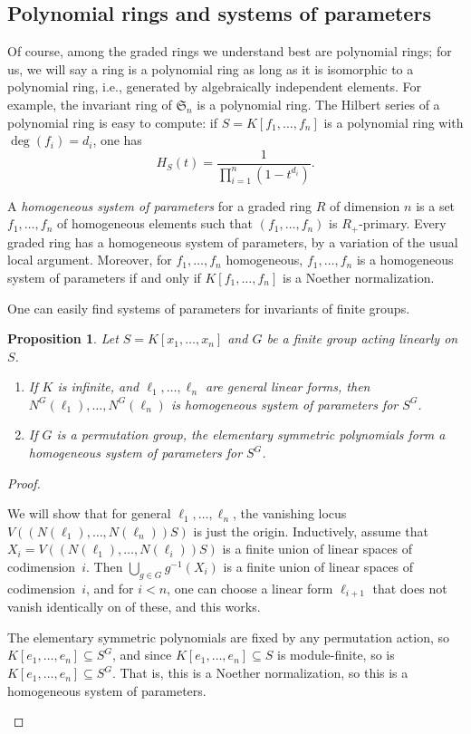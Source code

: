 \documentclass[12pt]{amsart}
\newtheorem{proposition}[theorem]{Proposition}
\theoremstyle{definition}
\numberwithin{equation}{theorem}
\begin{document}
\subsection*{Polynomial rings and systems of parameters} Of course, among the graded rings we understand best are polynomial rings; for us, we will say a ring is a polynomial ring as long as it is isomorphic to a polynomial ring, i.e., generated by algebraically independent elements. For example, the invariant ring of $\mathfrak{S}_n$ is a polynomial ring. The Hilbert series of a polynomial ring is easy to compute: if $S=K[f_1,\dots,f_n]$ is a polynomial ring with $\deg(f_i) = d_i$, one has
\[H_S(t) = \frac{1}{\prod_{i=1}^n (1-t^{d_i}) }.\]

 A \emph{homogeneous system of parameters} for a graded ring $R$ of dimension $n$ is a set $f_1,\dots,f_n$ of homogeneous elements such that $(f_1,\dots,f_n)$ is $R_+$-primary. Every graded ring has a homogeneous system of parameters, by a variation of the usual local argument. Moreover, for $f_1,\dots,f_n$ homogeneous, $f_1,\dots,f_n$ is a homogeneous system of parameters if and only if $K[f_1,\dots,f_n]$ is a Noether normalization.
 
 One can easily find systems of parameters for invariants of finite groups.
 
\begin{proposition} Let $S=K[x_1,\dots,x_n]$ and $G$ be a finite group acting linearly on $S$.
\begin{enumerate}
\item If $K$ is infinite, and $\ell_1,\dots,\ell_n$ are general linear forms, then $N^G(\ell_1),\dots,N^G(\ell_n)$ is homogeneous system of parameters for $S^G$.
\item If $G$ is a permutation group, the elementary symmetric polynomials form a homogeneous system of parameters for $S^G$.
\end{enumerate}
\end{proposition}
\begin{proof}
\begin{asparaenum}
\item We will show that for general $\ell_1,\dots,\ell_n$, the vanishing locus $V( (N(\ell_1),\dots,N(\ell_n))S)$ is just the origin. Inductively, assume that $X_i=V( (N(\ell_1),\dots,N(\ell_i))S)$ is a finite union of linear spaces of codimension~$i$. Then $\bigcup_{g\in G} g^{-1}(X_i)$ is a finite union of linear spaces of codimension~$i$, and for $i<n$, one can choose a linear form $\ell_{i+1}$ that does not vanish identically on of these, and this works.

\item The elementary symmetric polynomials are fixed by any permutation action, so ${K[e_1,\dots,e_n]\subseteq S^G}$, and since $K[e_1,\dots,e_n]\subseteq S$ is module-finite, so is ${K[e_1,\dots,e_n]\subseteq S^G}$. That is, this is a Noether normalization, so this is a homogeneous system of parameters.
\end{asparaenum}
\end{proof}
\end{document}
